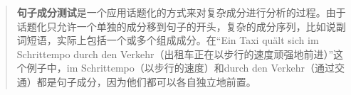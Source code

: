 \begin{quote}
\textbf{句子成分测试}是一个应用话题化的方式来对复杂成分进行分析的过程。由于话题化只允许一个单独的成分移到句子的开头，复杂的成分序列，比如说副词短语，实际上包括一个或多个组成成分。在“Ein Taxi quält sich im Schrittempo durch den Verkehr（出租车正在以步行的速度顽强地前进）”这个例子中，im Schrittempo（以步行的速度）和durch den Verkehr（通过交通）都是句子成分，因为他们都可以各自独立地前置。\citep[]{Bussmann83a}
\end{quote}

